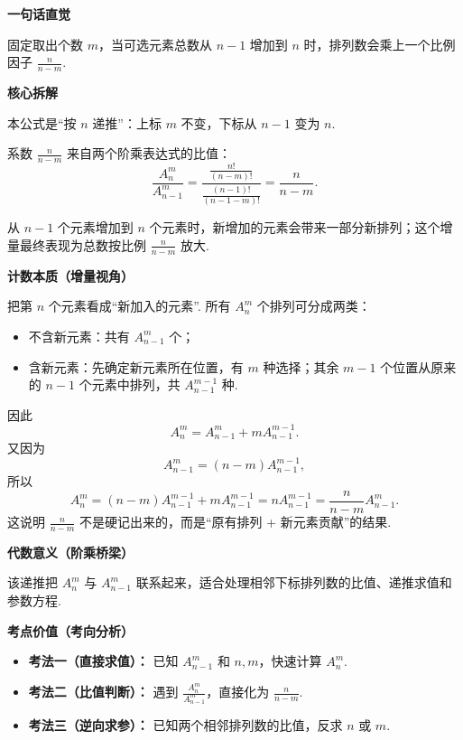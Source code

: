 \begin{explanationbox}
\textbf{\textcolor{CExplanation}{一句话直觉}}\par
固定取出个数 $m$，当可选元素总数从 $n-1$ 增加到 $n$ 时，排列数会乘上一个比例因子 $\frac{n}{n-m}$.

\medskip
\textbf{\textcolor{CExplanation}{核心拆解}}
\begin{description}[style=nextline, leftmargin=2.8em, labelsep=0.5em, itemsep=0.45em]
  \item[\textbf{要点一（递推方向）：}]
  本公式是“按 $n$ 递推”：上标 $m$ 不变，下标从 $n-1$ 变为 $n$.

  \item[\textbf{要点二（因子来源）：}]
  系数 $\frac{n}{n-m}$ 来自两个阶乘表达式的比值：
  \[
    \frac{A_n^m}{A_{n-1}^m}
    =\frac{\frac{n!}{(n-m)!}}{\frac{(n-1)!}{(n-1-m)!}}
    =\frac{n}{n-m}.
  \]

  \item[\textbf{要点三（计数本质）：}]
  从 $n-1$ 个元素增加到 $n$ 个元素时，新增加的元素会带来一部分新排列；这个增量最终表现为总数按比例 $\frac{n}{n-m}$ 放大.
\end{description}

\medskip
\textbf{\textcolor{CExplanation}{计数本质（增量视角）}}\par
把第 $n$ 个元素看成“新加入的元素”. 所有 $A_n^m$ 个排列可分成两类：
\begin{itemize}[leftmargin=*, itemsep=0.35em, topsep=0.35em]
  \item 不含新元素：共有 $A_{n-1}^m$ 个；
  \item 含新元素：先确定新元素所在位置，有 $m$ 种选择；其余 $m-1$ 个位置从原来的 $n-1$ 个元素中排列，共 $A_{n-1}^{m-1}$ 种.
\end{itemize}
因此
\[
  A_n^m=A_{n-1}^m+mA_{n-1}^{m-1}.
\]
又因为
\[
  A_{n-1}^m=(n-m)A_{n-1}^{m-1},
\]
所以
\[
  A_n^m=(n-m)A_{n-1}^{m-1}+mA_{n-1}^{m-1}=nA_{n-1}^{m-1}
  =\frac{n}{n-m}A_{n-1}^m.
\]
这说明 $\frac{n}{n-m}$ 不是硬记出来的，而是“原有排列 + 新元素贡献”的结果.

\medskip
\textbf{\textcolor{CExplanation}{代数意义（阶乘桥梁）}}\par
该递推把 $A_n^m$ 与 $A_{n-1}^m$ 联系起来，适合处理相邻下标排列数的比值、递推求值和参数方程.

\medskip
\textbf{\textcolor{CExplanation}{考点价值（考向分析）}}
\begin{itemize}[leftmargin=*, itemsep=0.5em, topsep=0.4em]
  \item \textbf{考法一（直接求值）：} 已知 $A_{n-1}^m$ 和 $n,m$，快速计算 $A_n^m$.
  \item \textbf{考法二（比值判断）：} 遇到 $\frac{A_n^m}{A_{n-1}^m}$，直接化为 $\frac{n}{n-m}$.
  \item \textbf{考法三（逆向求参）：} 已知两个相邻排列数的比值，反求 $n$ 或 $m$.
\end{itemize}


\end{explanationbox}
